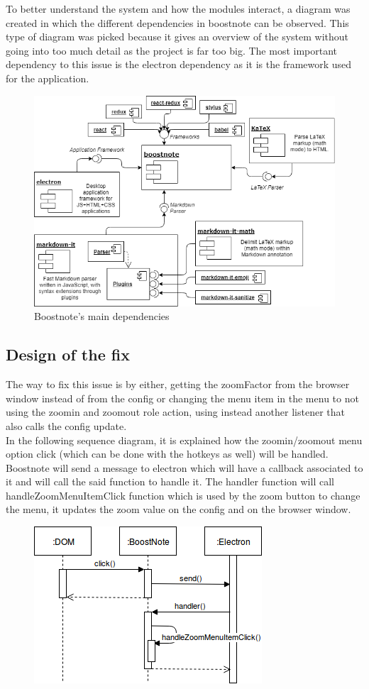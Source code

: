 \documentclass[main.tex]{subfiles}
\begin{document}
To better understand the system and how the modules interact, a diagram was created in which the different dependencies in boostnote can be observed. This type of diagram was picked because it gives an overview of the system without going into too much detail as the project is far too big. The most important dependency to this issue is the electron dependency as it is the framework used for the application.

\begin{figure}[h]
\includegraphics[scale=0.6]{images/diagram.png}
\centering
\caption{Boostnote's main dependencies}
\label{fig:boostnotearch}
\end{figure}
\clearpage

\subsection{Design of the fix}
\label{subsec:design2554}

The way to fix this issue is by either, getting the zoomFactor from the browser window instead of from the config or changing the menu item in the menu to not using the zoomin and zoomout role action, using instead another listener that also calls the config update.\\

In the following sequence diagram, it is explained how the zoomin/zoomout menu option click (which can be done with the hotkeys as well) will be handled. Boostnote will send a message to electron which will have a callback associated to it and will call the said function to handle it. The handler function will call handleZoomMenuItemClick function which is used by the zoom button to change the menu, it updates the zoom value on the config and on the browser window.\\

\begin{figure}[h]
\includegraphics[scale=0.9]{images/dyagram-2554.png}
\centering
\end{figure}

\nocite{*}
\end{document}
